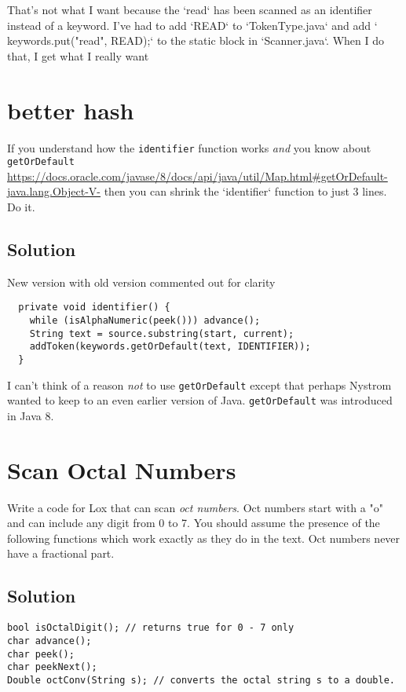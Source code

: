 \documentclass[twoside=false, DIV=14]{scrartcl}
\begin{document}
That's not what I want because the `read` has been scanned as an identifier instead of a keyword.  I've had to add `READ` to `TokenType.java` and add `    keywords.put("read",   READ);` to the static block in `Scanner.java`.  When I do that, I get what I really want



\section*{better hash}
If you understand how the \lstinline|identifier| function works \emph{and} you know about \lstinline|getOrDefault| \url{https://docs.oracle.com/javase/8/docs/api/java/util/Map.html#getOrDefault-java.lang.Object-V-} then you can shrink the `identifier` function to just 3 lines.  Do it.

\subsection*{Solution}
New version with old version commented out for clarity
\begin{lstlisting}
  private void identifier() {
    while (isAlphaNumeric(peek())) advance();
    String text = source.substring(start, current);
    addToken(keywords.getOrDefault(text, IDENTIFIER));
  }
\end{lstlisting}

I can't think of a reason \emph{not} to use \lstinline|getOrDefault| except that perhaps Nystrom wanted to keep to an even earlier version of Java. \lstinline|getOrDefault| was introduced in Java 8.

\section*{Scan Octal Numbers}
Write a code for Lox that can scan \emph{oct numbers}. Oct numbers start with a "o" and can include any digit from 0 to 7. You should assume the presence of the following functions which work exactly as they do in the text. Oct numbers never have a fractional part.

\subsection*{Solution}
\begin{lstlisting}
bool isOctalDigit(); // returns true for 0 - 7 only
char advance();
char peek();
char peekNext();
Double octConv(String s); // converts the octal string s to a double.
\end{lstlisting}
\end{document}
